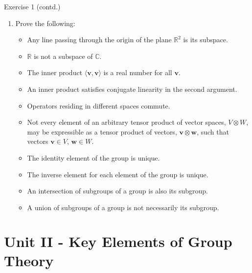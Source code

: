 \documentclass{beamer}
\newcounter{savedenum}
\newcommand*{\resume}{\setcounter{enumi}{\thesavedenum}}
\begin{document}
\begin{frame}{Exercise 1 (contd.)}
    \begin{enumerate}
        \resume
        \item Prove the following:
        \begin{itemize}
            \item Any line passing through the origin of the plane $\mathbb{R}^2$ is its subspace.
            \item $\mathbb{R}$ is not a subspace of $\mathbb{C}$.
            \item The inner product $\langle\mathbf{v},\mathbf{v}\rangle$ is a real number for all $\mathbf{v}$.
            \item An inner product satisfies conjugate linearity in the second argument.
            \item Operators residing in different spaces commute.
            \item Not every element of an arbitrary tensor product of vector spaces, $V\otimes W$, may be expressible as a tensor product of vectors, $\mathbf{v}\otimes\mathbf{w}$, such that vectors $\mathbf{v}\in V$, $\mathbf{w}\in W$.
            \item The identity element of the group is unique.
            \item The inverse element for each element of the group is unique.
            \item An intersection of subgroups of a group is also its subgroup.
            \item A union of subgroups of a group is not necessarily its subgroup.
        \end{itemize}
    \end{enumerate}
\end{frame}

\section{Unit II - Key Elements of Group Theory}
\end{document}
